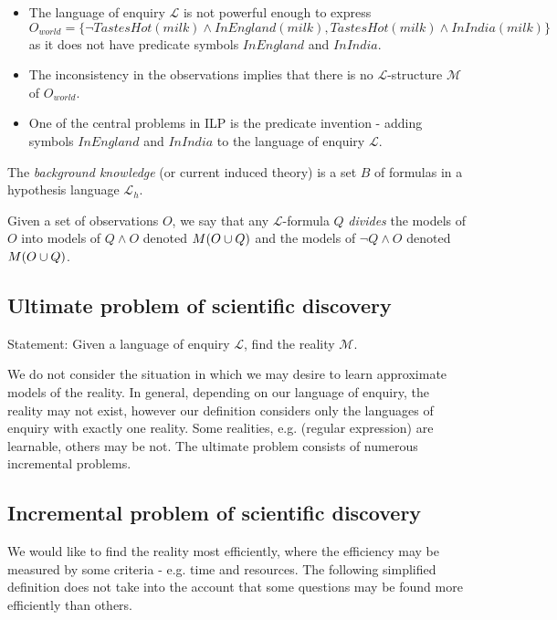 \begin{remark}
\begin{itemize}
\item The language of enquiry $\mathcal{L}$ is not powerful enough to express $O_{world}=\{\neg TastesHot(milk) \land InEngland(milk), TastesHot(milk) \land InIndia(milk)\}$
 as it does not have predicate symbols $InEngland$ and $InIndia$.
\item The inconsistency in the observations implies that there is no $\mathcal{L}$-structure $\mathcal{M}$ of $O_{world}$.
\item One of the central problems in ILP is the predicate invention - adding symbols $InEngland$ and $InIndia$ to the language of enquiry $\mathcal{L}$.
\end{itemize}
\end{remark}

\begin{defn}
The \emph{background knowledge} (or current induced theory) is a set $B$ of formulas in a hypothesis language $\mathcal{L}_h$.
\end{defn}

\begin{defn}
Given a set of observations $O$, we say that any $\mathcal{L}$-formula $Q$ \emph{divides} the models of $O$ into models of $Q \wedge O$ denoted $M(O \cup {Q})$ and the models of $\neg Q \wedge O$ denoted $M(O \cup {Q})$.
\end{defn}

\subsection{Ultimate problem of scientific discovery}
Statement: Given a language of enquiry $\mathcal{L}$, find the reality $\mathcal{M}$.

We do not consider the situation in which we may desire to learn approximate models of the reality. In general, depending on our language of enquiry, the reality may not exist, however our definition considers only the languages of enquiry with exactly one reality. Some realities, e.g. (regular expression) are learnable, others may be not. The ultimate problem consists of numerous incremental problems.

\subsection{Incremental problem of scientific discovery}
We would like to find the reality most efficiently, where the efficiency may be measured by some criteria - e.g. time and resources. The following simplified definition does not take into the account that some questions may be found more efficiently than others.

